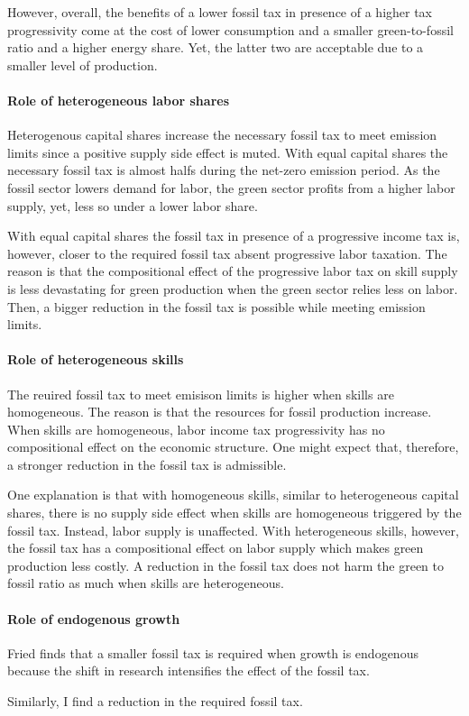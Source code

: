 However, overall, the benefits of a lower fossil tax in presence of a higher tax progressivity come at the cost of lower consumption and a smaller green-to-fossil ratio and a higher energy share. Yet, the latter two are acceptable due to a smaller level of production. 

\paragraph{Role of heterogeneous labor shares}
Heterogenous capital shares increase the necessary fossil tax to meet emission limits since a positive supply side effect is muted. 
With equal capital shares the necessary fossil tax is almost halfs during the net-zero emission period. 
As the fossil sector lowers demand for labor, the green sector profits from a higher labor supply, yet, less so under a lower labor share.  


With equal capital shares the fossil tax in presence of a progressive income tax is, however, closer to the required fossil tax absent progressive labor taxation.  The reason is that the compositional effect of the  progressive labor tax on skill supply is less devastating for green production when the green sector relies less on labor. Then, a bigger reduction in the fossil tax is possible while meeting emission limits. 

\paragraph{Role of heterogeneous skills}

The reuired fossil tax to meet emisison limits is higher when skills are homogeneous. The reason is that the resources for fossil production increase.
When skills are homogeneous, labor income tax progressivity has no compositional effect on the economic structure. One might expect that, therefore, a stronger reduction in the fossil tax is admissible. 

One explanation is that with homogeneous skills, similar to heterogeneous capital shares, there is no supply side effect when skills are homogeneous triggered by the fossil tax. Instead, labor supply is unaffected. With heterogeneous skills, however, the fossil tax has a compositional effect on labor supply which makes green production less costly. A reduction in the fossil tax does not harm the green to fossil ratio as much when skills are heterogeneous. 

\paragraph{Role of endogenous growth}
Fried finds that a smaller fossil tax is required when growth is endogenous because the shift in research intensifies the effect of the fossil tax. 

Similarly, I find a reduction in the required fossil tax. 